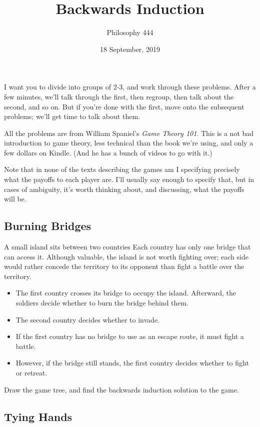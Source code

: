 \documentclass[11pt,]{article}
\title{Backwards Induction}
\author{Philosophy 444}
\date{18 September, 2019}
\providecommand{\tightlist}{%
  \setlength{\itemsep}{0pt}\setlength{\parskip}{0pt}}
\begin{document}
\maketitle

I want you to divide into groups of 2-3, and work through these
problems. After a few minutes, we'll talk through the first, then
regroup, then talk about the second, and so on. But if you're done with
the first, move onto the subsequent problems; we'll get time to talk
about them.

All the problems are from William Spaniel's \emph{Game Theory 101}. This
is a not bad introduction to game theory, less technical than the book
we're using, and only a few dollars on Kindle. (And he has a bunch of
videos to go with it.)

Note that in none of the texts describing the games am I specifying
precisely what the payoffs to each player are. I'll usually say enough
to specify that, but in cases of ambiguity, it's worth thinking about,
and discussing, what the payoffs will be.

\hypertarget{burning-bridges}{%
\subsection{Burning Bridges}\label{burning-bridges}}

A small island sits between two countries Each country has only one
bridge that can access it. Although valuable, the island is not worth
fighting over; each side would rather concede the territory to its
opponent than fight a battle over the territory.

\begin{itemize}
\tightlist
\item
  The first country crosses its bridge to occupy the island. Afterward,
  the soldiers decide whether to burn the bridge behind them.
\item
  The second country decides whether to invade.
\item
  If the first country has no bridge to use as an escape route, it must
  fight a battle.
\item
  However, if the bridge still stands, the first country decides whether
  to fight or retreat.
\end{itemize}

Draw the game tree, and find the backwards induction solution to the
game.

\hypertarget{tying-hands}{%
\subsection{Tying Hands}\label{tying-hands}}
\end{document}
